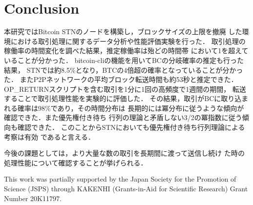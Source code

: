 \documentclass[graybox]{svmult}
\begin{document}



\section{Conclusion}
\label{sec:conclusion}


本研究ではBitcoin STNのノードを構築し，ブロックサイズの上限を撤廃
した環境における取引処理に関するデータ分析や性能評価実験を行った．
取引処理の稼働率の時間変化を調べた結果，推定稼働率は殆どの時間帯
において1を超えていることが分かった．
bitcoin-cliの機能を用いてBCの分岐確率の推定も行った結果，
STNでは約8.5\%となり，BTCの4倍超の確率となっていることが分かった．
またP2Pネットワークの平均ブロック転送時間も約53秒と推定できた．
OP\_RETURNスクリプトを含む取引を1分に1回の高頻度で1週間の期間，
転送することで取引処理性能を実験的に評価した．
その結果，取引がBCに取り込まれる確率は98\%であり，その時間分布は
長期的には冪分布に従うような傾向が確認できた．また優先権付き待ち
行列の理論と矛盾しない3/2の冪指数に従う傾向も確認できた．
このことからSTNにおいても優先権付き待ち行列理論による考察は有効
であると言える．

今後の課題としては，より大量な数の取引を長期間に渡って送信し続け
た時の処理性能について確認することが挙げられる．




\begin{acknowledgement}
 This work was partially supported by the Japan Society for the Promotion of 
Science (JSPS) through KAKENHI (Grants-in-Aid for Scientific Research) Grant 
Number 20K11797. 
\end{acknowledgement}



%
\end{document}
